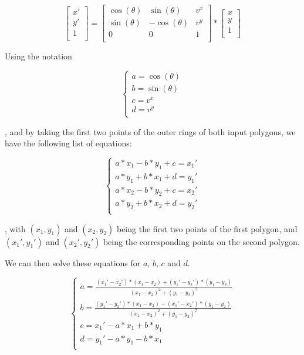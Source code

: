 \[
    \begin{bmatrix}
    x' \\
    y' \\ 
    1  \\       
    \end{bmatrix}
    =
    \begin{bmatrix}
    \cos(\theta) & \sin(\theta)  & v^x \\
    \sin(\theta) & -\cos(\theta) & v^y \\ 
    0            & 0             & 1   \\       
    \end{bmatrix}
    *
    \begin{bmatrix}
    x \\
    y \\ 
    1 \\       
    \end{bmatrix}
\]

Using the notation

\[
    \begin{cases}
        a = \cos(\theta) \\
        b = \sin(\theta) \\
        c = v^x          \\
        d = v^y          \\
    \end{cases}
\]

, and by taking the first two points of the outer rings of both input polygons, we have the following list of equations:

\[
    \begin{cases}
        a*x_1 - b*y_1 + c = x_1' \\
        a*y_1 + b*x_1 + d = y_1' \\
        a*x_2 - b*y_2 + c = x_2' \\
        a*y_2 + b*x_2 + d = y_2' \\
    \end{cases}
\]

, with $(x_1, y_1)$ and $(x_2, y_2)$ being the first two points of the first polygon, and $(x_1', y_1')$ and $(x_2', y_2')$ being the corresponding points on the second polygon.

We can then solve these equations for $a$, $b$, $c$ and $d$.

\[
    \begin{cases}
        a = \frac{(x_1' - x_2')*(x_1 - x_2) + (y_1' - y_2')*(y_1 - y_2)}{(x_1 - x_2)^2 + (y_1 - y_2)^2}\\
        b = \frac{(y_1' - y_2')*(x_1 - x_2) - (x_1' - x_2')*(y_1 - y_2)}{(x_1 - x_2)^2 + (y_1 - y_2)^2}\\
        c = x_1' - a*x_1 + b*y_1 \\
        d = y_1' - a*y_1 - b*x_1 \\
    \end{cases}
\]

